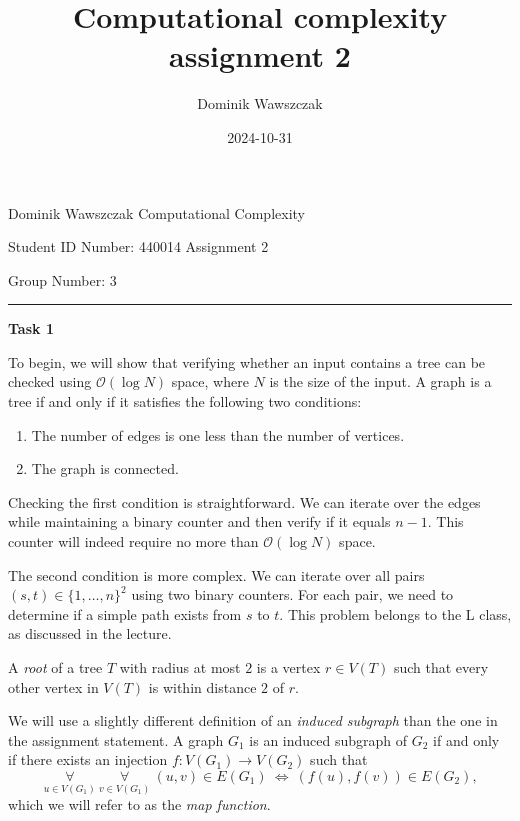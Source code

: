 \documentclass[12pt]{article}
\title{Computational complexity assignment 2}
\author{Dominik Wawszczak}
\date{2024-10-31}
\begin{document}
	\setlength{\parindent}{0 cm}
	
	Dominik Wawszczak \hfill Computational Complexity
	
	Student ID Number: 440014 \hfill Assignment 2
	
	Group Number: 3
	
	\bigskip
	\hrule
	\bigskip
	
	\textbf{Task 1}
	
	\medskip
	
	To begin, we will show that verifying whether an input contains a tree can
	be checked using \(\mathcal{O}(\log N)\) space, where \(N\) is the size of
	the input. A graph is a tree if and only if it satisfies the following two
	conditions:
	\begin{enumerate}
		\item The number of edges is one less than the number of vertices.
		\item The graph is connected.
	\end{enumerate}
	Checking the first condition is straightforward. We can iterate over the
	edges while maintaining a binary counter and then verify if it equals
	\(n - 1\). This counter will indeed require no more than
	\(\mathcal{O}(\log N)\) space.
	
	\medskip
	
	The second condition is more complex. We can iterate over all pairs \((s, t)
	\in \{1, \ldots, n\}^{2}\) using two binary counters. For each pair, we need
	to determine if a simple path exists from \(s\) to \(t\). This problem
	belongs to the L class, as discussed in the lecture.
	
	\medskip
	
	A \textit{root} of a tree \(T\) with radius at most \(2\) is a vertex \(r
	\in V(T)\) such that every other vertex in \(V(T)\) is within distance \(2\)
	of \(r\).
	
	\medskip
	
	We will use a slightly different definition of an \textit{induced subgraph}
	than the one in the assignment statement. A graph \(G_{1}\) is an induced
	subgraph of \(G_{2}\) if and only if there exists an injection \(f :
	V(G_{1}) \to V(G_{2})\) such that
	\[ \underset{u \in V(G_{1})}{\forall} \ \underset{v \in V(G_{1})}{\forall} \
	(u, v) \in E(G_{1}) \ \iff \ (f(u), f(v)) \in E(G_{2}) \text{,} \]
	which we will refer to as the \textit{map function}.
	
	\medskip
	
\end{document}
